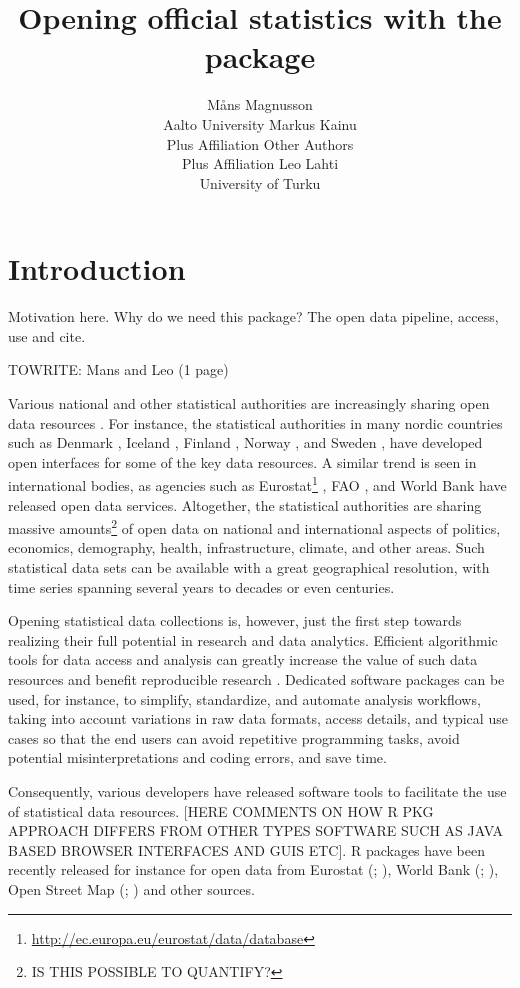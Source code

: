 \documentclass[article]{jss}
\author{M\r{a}ns Magnusson\\Aalto University \And 
        Markus Kainu\\Plus Affiliation  \And 
        Other Authors\\Plus Affiliation  \And
        Leo Lahti\\University of Turku}
\title{Opening  official statistics with the \pkg{pxweb} package}
\begin{document}


\section[Introduction]{Introduction}

Motivation here. Why do we need this package? The open data pipeline, access, use and cite.

TOWRITE: Mans and Leo (1 page)

Various national and other statistical authorities are increasingly sharing open data resources \cite{xxx}. For instance, the statistical authorities in many nordic countries such as Denmark \cite{xxx}, Iceland \cite{xxx}, Finland \cite{xxx}, Norway \cite{xxx}, and Sweden \cite{xxx}, have developed open interfaces for some of the key data resources. A similar trend is seen in international bodies, as agencies such as Eurostat\footnote{\url{http://ec.europa.eu/eurostat/data/database}} \cite{xxx}, FAO \cite{xxx}, and World Bank \cite{xxx} have released open data services. Altogether, the statistical authorities are sharing massive amounts\footnote{IS THIS POSSIBLE TO QUANTIFY?} of open data on national and international aspects of politics, economics, demography, health, infrastructure, climate, and other areas. Such statistical data sets can be available with a great geographical resolution, with time series spanning several years to decades or even centuries.

Opening statistical data collections is, however, just the first step towards realizing their full potential in research and data analytics. Efficient algorithmic tools for data access and analysis can greatly increase the value of such data resources and benefit reproducible research \citep{Gandrud13, Boettiger2015}. Dedicated software packages can be used, for instance, to simplify, standardize, and automate analysis workflows, taking into account variations in raw data formats, access details, and typical use cases so that the end users can avoid repetitive programming tasks, avoid potential misinterpretations and coding errors, and save time. 

Consequently, various developers have released software tools to facilitate the use of statistical data resources. [HERE COMMENTS ON HOW R PKG APPROACH DIFFERS FROM OTHER TYPES SOFTWARE SUCH AS JAVA BASED BROWSER INTERFACES AND GUIS ETC]. R packages have been recently released for instance for open data from Eurostat (; \citealt{eurostat}), World Bank (; \citealt{WDI}), Open Street Map (; \citealt{osmar}) and other sources.
\end{document}

